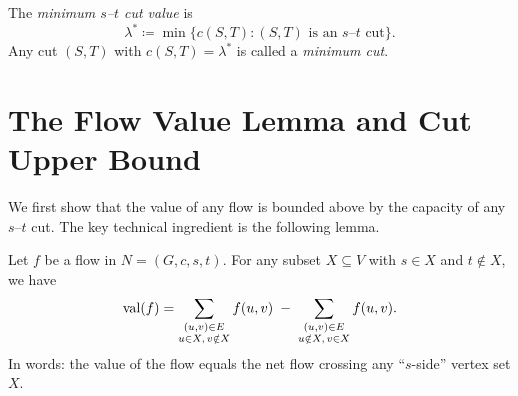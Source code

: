 \documentclass[11pt]{article}
\begin{document}
\begin{definition}
The \emph{minimum $s$--$t$ cut value} is
\[
  \lambda^* \coloneqq \min\{ c(S,T) : (S,T) \text{ is an $s$--$t$ cut} \}.
\]
Any cut $(S,T)$ with $c(S,T)=\lambda^*$ is called a \emph{minimum cut}.
\end{definition}

\section{The Flow Value Lemma and Cut Upper Bound}

We first show that the value of any flow is bounded above by the capacity of
any $s$--$t$ cut. The key technical ingredient is the following lemma.

\begin{lemma}\label{lem:flow-value}
Let $f$ be a flow in $N=(G,c,s,t)$. For any subset $X\subseteq V$ with
$s\in X$ and $t\notin X$, we have
\[
  \mathrm{val}(f)
  = \sum_{\substack{(u,v)\in E\\ u\in X,\, v\notin X}} f(u,v)
    \;-\;
    \sum_{\substack{(u,v)\in E\\ u\notin X,\, v\in X}} f(u,v).
\]
In words: the value of the flow equals the net flow crossing any ``$s$-side''
vertex set $X$.
\end{lemma}
\end{document}
